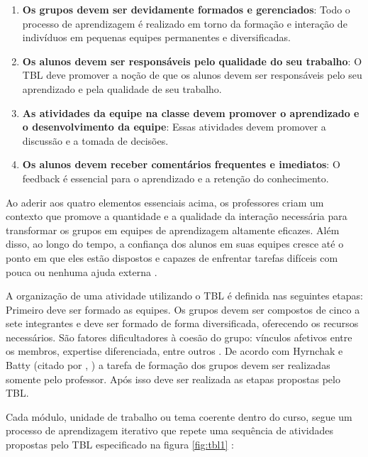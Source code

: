 \begin{enumerate}
  \item \textbf{Os grupos devem ser devidamente formados e gerenciados}: Todo o processo de aprendizagem é realizado em torno da formação e interação de indivíduos em pequenas equipes permanentes e diversificadas.
  \item \textbf{Os alunos devem ser responsáveis pelo qualidade do seu trabalho}: O TBL deve promover a noção de que os alunos devem ser responsáveis pelo seu aprendizado e pela qualidade de seu trabalho.
  \item \textbf{As atividades da equipe na classe devem promover o aprendizado e o desenvolvimento da equipe}: Essas atividades devem promover a discussão e a tomada de decisões.
  \item \textbf{Os alunos devem receber comentários frequentes e imediatos}: O feedback é essencial para o aprendizado e a retenção do conhecimento.
\end{enumerate}

Ao aderir aos quatro elementos essenciais acima, os professores criam um contexto que promove a quantidade e a qualidade da interação necessária para transformar os grupos em equipes de aprendizagem altamente eficazes. Além disso, ao longo do tempo, a confiança dos alunos em suas equipes cresce até o ponto em que eles estão dispostos e capazes de enfrentar tarefas difíceis com pouca ou nenhuma ajuda externa \cite{sweet}.

A organização de uma atividade utilizando o TBL é definida nas seguintes etapas: Primeiro deve ser formado as equipes.  Os grupos devem ser compostos de cinco a sete integrantes e deve ser formado de forma diversificada, oferecendo os recursos necessários. São fatores dificultadores à coesão do grupo: vínculos afetivos entre os membros, expertise diferenciada, entre outros \cite{bollela}. De acordo com Hyrnchak e Batty (citado por \citeauthor{bollela}, \citeyear{bollela}) a tarefa de formação dos grupos devem ser realizadas somente pelo professor. Após isso deve ser realizada as etapas propostas pelo TBL.

Cada módulo, unidade de trabalho ou tema coerente dentro do curso, segue um processo de aprendizagem iterativo que repete uma sequência de atividades propostas pelo TBL especificado na figura \ref{fig:tbl1} \cite{bollela}:


